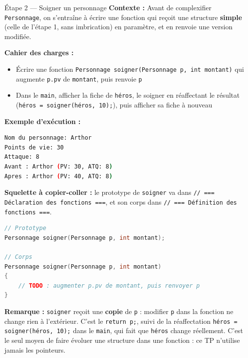 \begin{UPSTIManipulation}{Étape 2 — Soigner un personnage}
  \textbf{Contexte :} Avant de complexifier \texttt{Personnage}, on s'entraîne à écrire une
  fonction qui reçoit une structure \textbf{simple} (celle de l'étape 1, sans imbrication) en
  paramètre, et en renvoie une version modifiée.

  \textbf{Cahier des charges :}
  \begin{itemize}
    \item Écrire une fonction \texttt{Personnage soigner(Personnage p, int montant)} qui
      augmente \texttt{p.pv} de \texttt{montant}, puis renvoie \texttt{p}
    \item Dans le \texttt{main}, afficher la fiche de \texttt{héros}, le soigner en
      réaffectant le résultat (\texttt{héros = soigner(héros, 10);}), puis afficher sa fiche à
      nouveau
  \end{itemize}

  \textbf{Exemple d'exécution :}
  \begin{lstlisting}[language=bash]
Nom du personnage: Arthor
Points de vie: 30
Attaque: 8
Avant : Arthor (PV: 30, ATQ: 8)
Apres : Arthor (PV: 40, ATQ: 8)
  \end{lstlisting}

  \textbf{Squelette à copier-coller :} le prototype de \texttt{soigner} va dans
  \texttt{// === Déclaration des fonctions ===}, et son corps dans
  \texttt{// === Définition des fonctions ===}.

  \begin{lstlisting}[language=C]
// Prototype
Personnage soigner(Personnage p, int montant);

// Corps
Personnage soigner(Personnage p, int montant)
{
    // TODO : augmenter p.pv de montant, puis renvoyer p
}
  \end{lstlisting}

  \textbf{Remarque :} \texttt{soigner} reçoit une \textbf{copie} de \texttt{p} : modifier
  \texttt{p} dans la fonction ne change rien à l'extérieur. C'est le \texttt{return p;}, suivi de
  la réaffectation \texttt{héros = soigner(héros, 10);} dans le \texttt{main}, qui fait que
  \texttt{héros} change réellement. C'est le seul moyen de faire évoluer une structure dans une
  fonction : ce TP n'utilise jamais les pointeurs.

\end{UPSTIManipulation}

